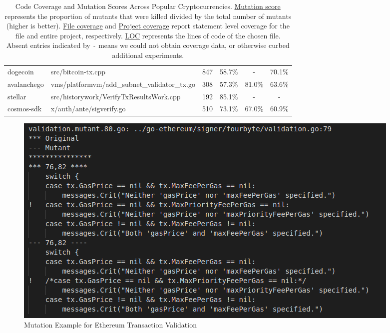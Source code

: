 \begin{table}[ht!]
\begin{tabular}{llrccc}
\cmidrule{2-6}
dogecoin                        & src/bitcoin-tx.cpp                            & 847              & 58.7\%                  & -                       & 70.1\%                   \\
\cmidrule{2-6}
avalanchego                     & vms/platformvm/add\_subnet\_validator\_tx.go  & 308              & 57.3\%                  & 81.0\%                  & 63.6\%                   \\
\cmidrule{2-6}
  stellar                       & src/historywork/VerifyTxResultsWork.cpp       & 192              & 85.1\%                  & -                       & -                        \\
\cmidrule{2-6}
cosmos-sdk                      & x/auth/ante/sigverify.go                      & 510              & 73.1\%                  & 67.0\%                  & 60.9\%                   \\
\bottomrule
\end{tabular}
\caption{Code Coverage and Mutation Scores Across Popular Cryptocurrencies. \underline{Mutation score} represents the proportion of mutants that were killed divided by the total number of mutants (higher is better).
\underline{File coverage} and \underline{Project coverage} report statement level coverage for the file and entire project, respectively. \underline{LOC} represents the lines of code of the chosen file. Absent entries indicated by \texttt{-} means we could not
obtain coverage data, or otherwise curbed additional experiments.
}
\label{tab:comparison}
\end{table}

\begin{figure}
\vspace{2mm}
\includegraphics[width=0.9\columnwidth]{mutation-example.png}
\caption{Mutation Example for Ethereum Transaction Validation}
\label{fig:mutation}
\end{figure}

